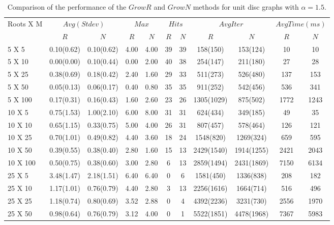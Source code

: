 \begin{table*}[htb]
\footnotesize
\center
\caption{\label{table:Alpha15}
Comparison of the performance of the $GrowR$ and $GrowN$ methods for  unit disc graphs with $\alpha = 1.5$.}
\begin{tabularx}{430pt}{X*{10}{c}}

\toprule
Roots X M&  \multicolumn{2}{c}{$Avg(Stdev)$}  & \multicolumn{2}{c}{$Max$} & \multicolumn{2}{c}{$Hits$}& \multicolumn{2}{c}{$Avg Iter$}& \multicolumn{2}{c}{$Avg Time(ms)$}\\
& $R$ & $N$  &  $R$ & $N$ &  $R$ & $N$& $R$ & $N$&  $R$ & $N$\\

\midrule
5 X 5 & 0.10(0.62) & 0.10(0.62) & 4.00 & 4.00 & 39 & 39 & 158(150) & 153(124) & 10 & 10 \\
5 X 10 & 0.00(0.00) & 0.10(0.44) & 0.00 & 2.00 & 40 & 38 & 254(147) & 211(180) & 27 & 28 \\
5 X 25 & 0.38(0.69) & 0.18(0.42) & 2.40 & 1.60 & 29 & 33 & 511(273) & 526(480) & 137 & 153 \\
5 X 50 & 0.05(0.13) & 0.06(0.17) & 0.40 & 0.80 & 35 & 35 & 911(252) & 542(456) & 536 & 341 \\
5 X 100 & 0.17(0.31) & 0.16(0.43) & 1.60 & 2.60 & 23 & 26 & 1305(1029) & 875(502) & 1772 & 1243 \\
\midrule
10 X 5 & 0.75(1.53) & 1.00(2.10) & 6.00 & 8.00 & 31 & 31 & 624(434) & 349(185) & 49 & 35 \\
10 X 10 & 0.65(1.15) & 0.33(0.75) & 5.00 & 4.00 & 26 & 31 & 807(457) & 578(464) & 126 & 121 \\
10 X 25 & 0.70(1.01) & 0.49(0.82) & 4.40 & 3.60 & 18 & 24 & 1548(820) & 1269(324) & 659 & 595 \\
10 X 50 & 0.39(0.55) & 0.38(0.40) & 2.80 & 1.60 & 15 & 13 & 2429(1540) & 1914(1255) & 2421 & 2043 \\
10 X 100 & 0.50(0.75) & 0.38(0.60) & 3.00 & 2.80 & 6 & 13 & 2859(1494) & 2431(1869) & 7150 & 6134 \\
\midrule
25 X 5 & 3.48(1.47) & 2.18(1.51) & 6.40 & 6.40 & 0 & 6 & 1581(450) & 1336(838) & 208 & 182 \\
25 X 10 & 1.17(1.01) & 0.76(0.79) & 4.40 & 2.80 & 3 & 13 & 2256(1616) & 1664(714) & 516 & 496 \\
25 X 25 & 1.18(0.74) & 0.80(0.69) & 3.52 & 2.88 & 0 & 4 & 4392(2236) & 3231(730) & 2556 & 1970 \\
25 X 50 & 0.98(0.64) & 0.76(0.79) & 3.12 & 4.00 & 0 & 1 & 5522(1851) & 4478(1968) & 7367 & 5983 \\

\end{tabularx}
\end{table*}
